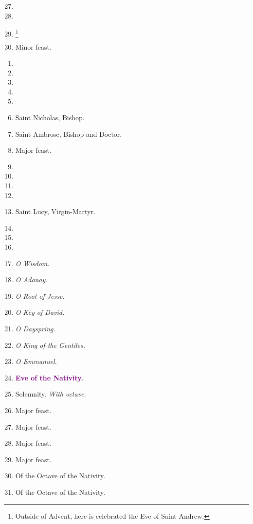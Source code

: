 		\begin{enumerate}
			\setcounter{enumi}{26}
			\item 
			\item %
			\item \footnote{Outside of Advent, here is celebrated the Eve of Saint Andrew.}
			\item {} Minor feast.
		\end{enumerate}
		\begin{enumerate}
			\item %
			\item %
			\item  %
			\item  %
			\item %
			\item Saint Nicholas, Bishop. 
			\item Saint Ambrose, Bishop and Doctor. 
			\item {} Major feast.
			\item %
			\item %
			\item %
			\item  %
			\item Saint Lucy, Virgin-Martyr. 
			\item  %
			\item %
			\item %
			\item {\textit{\small O Wisdom.}} %
			\item  {\textit{\small O Adonay.}} %
			\item  {\textit{\small O Root of Jesse.}} %
			\item  {\textit{\small O Key of David.}} %
			\item {\textit{\small O Dayspring.}} %
			\item {\textit{\small O King of the Gentiles.}} %
			\item {\textit{\small O Emmanuel.}} %
			\item \textcolor{purple}{\textbf{Eve of the Nativity.}}
			\item \textbf{} Solemnity. \textit{With octave.}
			\item {} Major feast.
			\item {} Major feast.
			\item {} Major feast.
			\item {} Major feast.
			\item Of the Octave of the Nativity. %
			\item Of the Octave of the Nativity.
		\end{enumerate}

